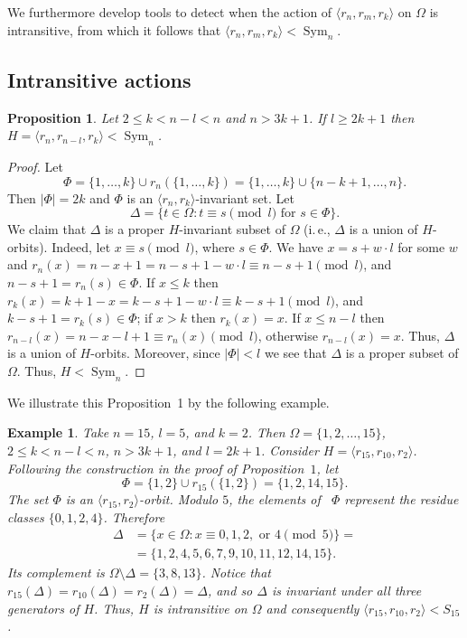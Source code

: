 \documentclass[
final
]{dmtcs-episciences}
\newtheorem{proposition}{Proposition}
\newtheorem{example}{Example}
\DeclareMathOperator{\Sym}{\mathrm{Sym}}
\begin{document}
We furthermore develop tools to detect when the action of $\langle r_n,r_m,r_k\rangle$ on $\Omega$ is intransitive, from which it follows that $\langle r_n,r_m,r_k\rangle<\Sym_n$.

\subsection{Intransitive actions}\label{sec:intransitive_actions}

\medskip





\begin{proposition} Let $2 \leqslant k < n-l < n$ and $n>3k+1$. If $l \geqslant 2k+1$ then $H= \langle r_n, r_{n-l}, r_k\rangle < \Sym_n$.

\end{proposition}

\begin{proof} Let $$\Phi = \{1, \ldots, k\} \cup r_n(\{1, \ldots, k\})=\{1, \ldots, k\} \cup \{n-k+1, \ldots, n\}.$$ Then $|\Phi|=2k$ and $\Phi$ is an $\langle r_n, r_k\rangle$-invariant set. Let $$\Delta=\{t \in \Omega : t \equiv s\pmod{l} \mbox{ for } s \in \Phi\}.$$ We claim that $\Delta$ is a proper $H$-invariant subset of $\Omega$ (i.\,e., $\Delta$  is a union of $H$-orbits). Indeed, let $x\equiv s\pmod{l}$, where $s\in \Phi$. We have $x = s + w\cdot l$ for some $w$ and $r_n(x)=n-x+1=n-s+1-w\cdot l \equiv n-s+1 \pmod{l}$, and $n-s+1=r_n(s) \in \Phi$. If $x \leqslant k$ then $r_k(x)=k+1-x=k-s+1-w\cdot l\equiv k-s+1 \pmod{l}$, and $ k-s+1=r_k(s)\in \Phi$; if $x>k$ then $r_k(x)=x$. If $x\leqslant n-l$ then $r_{n-l}(x)=n-x-l+1 \equiv r_n(x) \pmod{l}$, otherwise $r_{n-l}(x)=x$. Thus, $\Delta$ is a union of $H$-orbits. Moreover, since $|\Phi|<l$ we see that $\Delta$ is a proper subset of $\Omega$. Thus, $H< \Sym_n$.  
\end{proof}

We illustrate this Proposition~1 by the following example.

\begin{example}
Take $n=15$, $l=5$, and $k=2$. Then $\Omega=\{1,2,\ldots,15\}$, $2\leqslant k<n-l<n$, $n>3k+1$, and $l=2k+1$. Consider $H=\langle r_{15},r_{10},r_2\rangle$. Following the construction in the proof of Proposition~$1$, let
\[
\Phi
=
\{1,2\}\cup r_{15}(\{1,2\})
=
\{1,2,14,15\}.
\]
The set $\Phi$ is an $\langle r_{15},r_2\rangle$-orbit. Modulo $5$, the elements of \ $\Phi$ represent the residue classes $\{0,1,2,4\}$. Therefore
\begin{align*}
\Delta&=\{x\in\Omega:x\equiv0,1,2,\text{ or }4\pmod5\}=\\
&=\{1,2,4,5,6,7,9,10,11,12,14,15\}.
\end{align*}
Its complement is $\Omega\setminus\Delta=\{3,8,13\}$. Notice that $r_{15}(\Delta)=r_{10}(\Delta)=r_2(\Delta)=\Delta$, and so $\Delta$ is invariant under all three generators of $H$. Thus, $H$ is intransitive on $\Omega$ and consequently $\langle r_{15},r_{10},r_2\rangle<S_{15}$.
\end{example}
\end{document}
